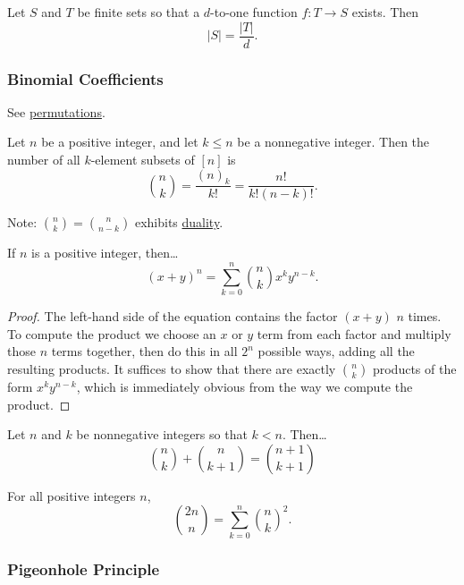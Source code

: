 \begin{theorem}
Let $S$ and $T$ be finite sets so that a $d$-to-one function $f : T \rightarrow S$ exists. Then
$$|S| = \frac{|T|}{d}.$$
\end{theorem}

\subsubsection{Binomial Coefficients}\label{binomials}

See \hyperref[permutation]{permutations}.

\begin{theorem}
Let $n$ be a positive integer, and let $k \leq n$ be a nonnegative integer. Then the number of all $k$-element subsets of $[n]$ is
$${n \choose k} = \frac{(n)_k}{k!} = \frac{n!}{k!(n-k)!}.$$
\end{theorem}

Note: ${n \choose k} = {n \choose n-k}$ exhibits \hyperref[duality]{duality}.

\begin{theorem}
If $n$ is a positive integer, then\dots
$$(x+y)^n = \sum_{k=0}^n {n \choose k} x^k y^{n-k}.$$ 
\end{theorem}

\begin{proof}
The left-hand side of the equation contains the factor $(x + y)$ $n$ times. To compute the product we choose an $x$ or $y$ term from each factor and multiply those $n$ terms together, then do this
in all $2^n$ possible ways, adding all the resulting products. It suffices to show that there are exactly ${n \choose k}$ products of the form $x^k y^{n-k}$, which is immediately obvious from the
way we compute the product.
\end{proof}

\begin{theorem}
Let $n$ and $k$ be nonnegative integers so that $k < n.$ Then\dots
$${n \choose k} + {n \choose k + 1} = {n + 1 \choose k + 1}$$
\end{theorem}

\begin{theorem}
For all positive integers $n$,
$${2n \choose n} = \sum^n_{k=0}{n \choose k}^2.$$
\end{theorem}

\subsubsection{Pigeonhole Principle}\label{pigeonholeprinciplecombinatorics}

